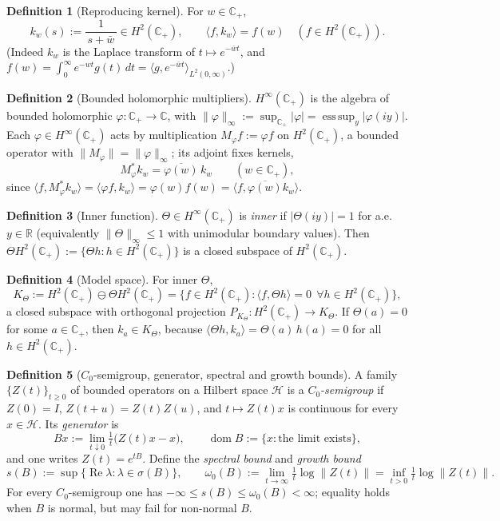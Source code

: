\documentclass[11pt]{amsart}
\theoremstyle{plain}
\theoremstyle{definition}
\newtheorem{definition}{Definition}
\theoremstyle{remark}
\DeclareMathOperator{\dom}{dom}
\DeclareMathOperator*{\esssup}{ess\,sup}
\newcommand{\C}{\mathbb{C}}
\newcommand{\R}{\mathbb{R}}
\newcommand{\Cp}{\mathbb{C}_{+}}
\newcommand{\Ht}{H^{2}(\Cp)}
\newcommand{\Hi}{H^{\infty}(\Cp)}
\newcommand{\Kt}{K_{\Theta}}
\newcommand{\ip}[2]{\langle #1, #2\rangle}
\newcommand{\norm}[1]{\lVert #1 \rVert}
\newcommand{\abs}[1]{\lvert #1 \rvert}
\renewcommand{\Re}{\operatorname{Re}}
\begin{document}
\begin{definition}[Reproducing kernel]\label{def:kernel}
For $w\in\Cp$,
\[
  k_{w}(s):=\frac{1}{\,s+\bar w\,}\in\Ht,\qquad \ip{f}{k_{w}}=f(w)\quad(f\in\Ht).
\]
(Indeed $k_{w}$ is the Laplace transform of $t\mapsto e^{-\bar w t}$, and
$f(w)=\int_{0}^{\infty}e^{-wt}g(t)\,dt=\ip{g}{e^{-\bar w t}}_{L^{2}(0,\infty)}$.)
\end{definition}

\begin{definition}[Bounded holomorphic multipliers]\label{def:hinf}
$\Hi$ is the algebra of bounded holomorphic $\varphi:\Cp\to\C$, with
$\norm{\varphi}_{\infty}:=\sup_{\Cp}\abs{\varphi}=\esssup_{y}\abs{\varphi(iy)}$. Each
$\varphi\in\Hi$ acts by multiplication $M_{\varphi}f:=\varphi f$ on $\Ht$, a bounded
operator with $\norm{M_{\varphi}}=\norm{\varphi}_{\infty}$; its adjoint fixes kernels,
\begin{equation}\label{eq:adjkernel}
  M_{\varphi}^{*}k_{w}=\overline{\varphi(w)}\,k_{w}\qquad(w\in\Cp),
\end{equation}
since $\ip{f}{M_{\varphi}^{*}k_{w}}=\ip{\varphi f}{k_{w}}=\varphi(w)f(w)
=\ip{f}{\overline{\varphi(w)}k_{w}}$.
\end{definition}

\begin{definition}[Inner function]\label{def:inner}
$\Theta\in\Hi$ is \emph{inner} if $\abs{\Theta(iy)}=1$ for a.e.\ $y\in\R$ (equivalently
$\norm{\Theta}_{\infty}\le1$ with unimodular boundary values). Then
$\Theta\Ht:=\{\Theta h:h\in\Ht\}$ is a closed subspace of $\Ht$.
\end{definition}

\begin{definition}[Model space]\label{def:model}
For inner $\Theta$,
\[
  \Kt:=\Ht\ominus\Theta\Ht=\{f\in\Ht:\ip{f}{\Theta h}=0\ \ \forall h\in\Ht\},
\]
a closed subspace with orthogonal projection $P_{\Kt}:\Ht\to\Kt$. If $\Theta(a)=0$ for
some $a\in\Cp$, then $k_{a}\in\Kt$, because
$\ip{\Theta h}{k_{a}}=\Theta(a)\,h(a)=0$ for all $h\in\Ht$.
\end{definition}

\begin{definition}[$C_{0}$-semigroup, generator, spectral and growth bounds]\label{def:semigroup}
A family $\{Z(t)\}_{t\ge0}$ of bounded operators on a Hilbert space $\mathcal H$ is a
\emph{$C_{0}$-semigroup} if $Z(0)=I$, $Z(t+u)=Z(t)Z(u)$, and $t\mapsto Z(t)x$ is
continuous for every $x\in\mathcal H$. Its \emph{generator} is
\[
  Bx:=\lim_{t\downarrow0}\tfrac1t\bigl(Z(t)x-x\bigr),\qquad
  \dom B:=\{x:\text{the limit exists}\},
\]
and one writes $Z(t)=e^{tB}$. Define the \emph{spectral bound} and \emph{growth bound}
\[
  s(B):=\sup\{\Re\lambda:\lambda\in\sigma(B)\},\qquad
  \omega_{0}(B):=\lim_{t\to\infty}\tfrac1t\log\norm{Z(t)}=\inf_{t>0}\tfrac1t\log\norm{Z(t)}.
\]
For every $C_{0}$-semigroup one has $-\infty\le s(B)\le\omega_{0}(B)<\infty$; equality
holds when $B$ is normal, but may fail for non-normal $B$.
\end{definition}
\end{document}
